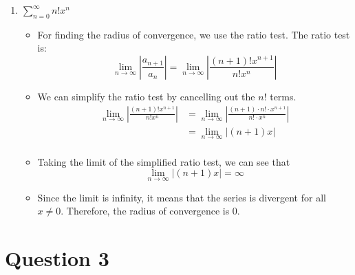 \documentclass[12pt]{article}
\begin{document}
\begin{enumerate}[leftmargin=\labelsep]
\begin{enumerate}
        \item $\displaystyle{\sum_{n=0}^{\infty} n! x^n}$
        \begin{itemize}[label={}]
                \item For finding the radius of convergence, we use the ratio test. The ratio test is:
                \begin{equation*}
                    \lim_{n \to \infty} \left| \frac{a_{n+1}}{a_n} \right| = \lim_{n \to \infty} \left| \frac{(n+1)! x^{n+1}}{n! x^n} \right|
                \end{equation*}
                \item We can simplify the ratio test by cancelling out the $n!$ terms.
                \begin{equation*}
                    \begin{split}
                        \lim_{n \to \infty} \left| \frac{(n+1)! x^{n+1}}{n! x^n} \right| &= \lim_{n \to \infty} \left| \frac{(n+1) \cdot n! \cdot x^{n+1}}{n! \cdot x^n} \right| \\
                        &= \lim_{n \to \infty} \left| (n+1) x \right| \\
                    \end{split}
                \end{equation*}
                \item Taking the limit of the simplified ratio test, we can see that
                \begin{equation*}
                    \lim_{n \to \infty} \left| (n+1) x \right| = \infty
                \end{equation*}
                \item Since the limit is infinity, it means that the series is divergent for all $x \neq 0$. Therefore, the radius of convergence is $0$.
            \end{itemize}
    \end{enumerate}

    \newpage

    \section*{Question 3}


\end{enumerate}
\end{document}
